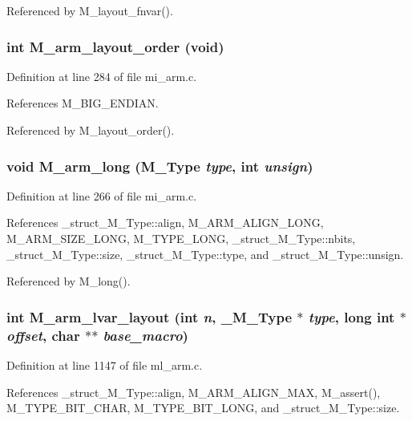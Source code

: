 Referenced by M\_\-layout\_\-fnvar().
\subsubsection{\setlength{\rightskip}{0pt plus 5cm}int M\_\-arm\_\-layout\_\-order (void)}\label{m__arm_8h_c006c4ffd74252084d8cb7573276dd43}




Definition at line 284 of file mi\_\-arm.c.

References M\_\-BIG\_\-ENDIAN.

Referenced by M\_\-layout\_\-order().
\subsubsection{\setlength{\rightskip}{0pt plus 5cm}void M\_\-arm\_\-long (\bf{M\_\-Type} {\em type}, int {\em unsign})}\label{m__arm_8h_1488931384d29acdb9676307725ea14a}




Definition at line 266 of file mi\_\-arm.c.

References \_\-struct\_\-M\_\-Type::align, M\_\-ARM\_\-ALIGN\_\-LONG, M\_\-ARM\_\-SIZE\_\-LONG, M\_\-TYPE\_\-LONG, \_\-struct\_\-M\_\-Type::nbits, \_\-struct\_\-M\_\-Type::size, \_\-struct\_\-M\_\-Type::type, and \_\-struct\_\-M\_\-Type::unsign.

Referenced by M\_\-long().
\subsubsection{\setlength{\rightskip}{0pt plus 5cm}int M\_\-arm\_\-lvar\_\-layout (int {\em n}, \bf{\_\-M\_\-Type} $\ast$ {\em type}, long int $\ast$ {\em offset}, char $\ast$$\ast$ {\em base\_\-macro})}\label{m__arm_8h_5bb3eaa54605e6a6b1446a2ee3a21e7b}




Definition at line 1147 of file ml\_\-arm.c.

References \_\-struct\_\-M\_\-Type::align, M\_\-ARM\_\-ALIGN\_\-MAX, M\_\-assert(), M\_\-TYPE\_\-BIT\_\-CHAR, M\_\-TYPE\_\-BIT\_\-LONG, and \_\-struct\_\-M\_\-Type::size.


